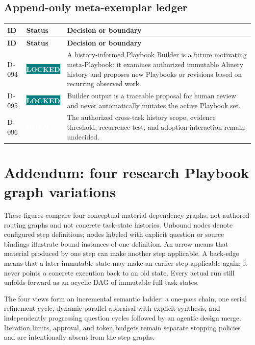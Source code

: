 \documentclass[11pt]{article}
\newcommand{\statuspill}[2]{%
  \begingroup\setlength{\fboxsep}{3pt}%
  \colorbox{#1}{\textcolor{white}{\sffamily\bfseries\scriptsize #2}}%
  \endgroup}
\newcommand{\Locked}{\statuspill{Teal}{LOCKED}}
\newcommand{\Open}{\statuspill{Amber}{OPEN}}
\begin{document}
\subsection{Append-only meta-exemplar ledger}

\begin{longtable}{@{}L{0.52in}L{0.88in}L{5.10in}@{}}
\toprule
\textbf{ID} & \textbf{Status} & \textbf{Decision or boundary} \\
\midrule
\endfirsthead
\toprule
\textbf{ID} & \textbf{Status} & \textbf{Decision or boundary} \\
\midrule
\endhead
D-094 & \Locked & A history-informed Playbook Builder is a future motivating meta-Playbook: it examines authorized immutable Alinery history and proposes new Playbooks or revisions based on recurring observed work. \\
D-095 & \Locked & Builder output is a traceable proposal for human review and never automatically mutates the active Playbook set. \\
D-096 & \Open & The authorized cross-task history scope, evidence threshold, recurrence test, and adoption interaction remain undecided. \\
\bottomrule
\end{longtable}
\thispagestyle{fancy}

\clearpage
\section{Addendum: four research Playbook graph variations}

\begin{summarybox}
These figures compare four conceptual material-dependency graphs, not authored routing graphs and not concrete task-state histories. Unbound nodes denote configured step definitions; nodes labeled with explicit question or source bindings illustrate bound instances of one definition. An arrow means that material produced by one step can make another step applicable. A back-edge means that a later immutable state may make an earlier step applicable again; it never points a concrete execution back to an old state. Every actual run still unfolds forward as an acyclic DAG of immutable full task states.
\end{summarybox}

The four views form an incremental semantic ladder: a one-pass chain, one serial refinement cycle, dynamic parallel appraisal with explicit synthesis, and independently progressing question cycles followed by an agentic design merge. Iteration limits, approval, and token budgets remain separate stopping policies and are intentionally absent from the step graphs.
\end{document}
